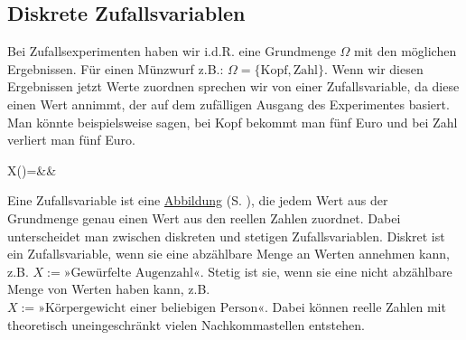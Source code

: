 \documentclass[12pt]{article}
\newcommand{\highlight}[2]{\textcolor{blue}{\hyperref[#1]{#2}} (S. \pageref{#1})}
\begin{document}
		\subsection{Diskrete Zufallsvariablen}
			Bei Zufallsexperimenten haben wir i.d.R. eine Grundmenge $\Omega$ mit den möglichen Ergebnissen. Für einen Münzwurf z.B.: $\Omega=\{\text{Kopf},\text{Zahl}\}$. Wenn wir diesen Ergebnissen jetzt Werte zuordnen sprechen wir von einer Zufallsvariable, da diese einen Wert annimmt, der auf dem zufälligen Ausgang des Experimentes basiert. Man könnte beispielsweise sagen, bei Kopf bekommt man fünf Euro und bei Zahl verliert man fünf Euro.
			\begin{flalign*}
				X(\omega)=&&
			\end{flalign*}
			Eine Zufallsvariable ist eine \highlight{subsec:abbildungen}{Abbildung}, die jedem Wert aus der Grundmenge genau einen Wert aus den reellen Zahlen zuordnet. Dabei unterscheidet man zwischen diskreten und stetigen Zufallsvariablen. Diskret ist ein Zufallsvariable, wenn sie eine abzählbare Menge an Werten annehmen kann, z.B. $X:=\text{»Gewürfelte Augenzahl«}$. Stetig ist sie, wenn sie eine nicht abzählbare Menge von Werten haben kann, z.B. $X:=\text{»Körpergewicht einer beliebigen Person«}$. Dabei können reelle Zahlen mit theoretisch uneingeschränkt vielen Nachkommastellen entstehen.
\end{document}
